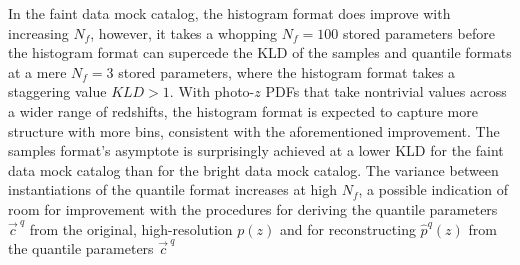 \documentclass[\docopts]{\docclass}
\newcommand{\pz}{photo-$z$ PDF}
\newcommand{\mgdata}{bright\xspace}
\newcommand{\ssdata}{faint\xspace}
\begin{document}
In the \ssdata data mock catalog, the histogram format does improve with 
increasing $N_{f}$, however, it takes a whopping $N_{f}=100$ stored parameters 
before the histogram format can supercede the KLD of the samples and quantile 
formats at a mere $N_{f}=3$ stored parameters, where the histogram format takes 
a staggering value $KLD>1$.
With \pz s that take nontrivial values across a wider range of redshifts, the 
histogram format is expected to capture more structure with more bins, 
consistent with the aforementioned improvement.
The samples format's asymptote is surprisingly achieved at a lower KLD for the 
\ssdata data mock catalog than for the \mgdata data mock catalog.
The variance between instantiations of the quantile format increases at high 
$N_{f}$, a possible indication of room for improvement with the procedures for 
deriving the quantile parameters $\vec{c}^{\ q}$ from the original, 
high-resolution $p(z)$ and for reconstructing $\hat{p}^{q}(z)$ from the 
quantile parameters $\vec{c}^{\ q}$
\end{document}
